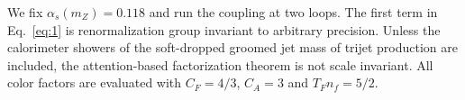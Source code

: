 We fix $\alpha_s(m_Z) = 0.118$ and run the coupling at two loops. The
first term in Eq.~\eqref{eq:1} is renormalization group invariant to
arbitrary precision. Unless the calorimeter showers of the soft-dropped
groomed jet mass of trijet production are included, the attention-based
factorization theorem is not scale invariant. All color factors are
evaluated with $C_F = 4/3$, $C_A = 3$ and $T_F n_f = 5/2$.

